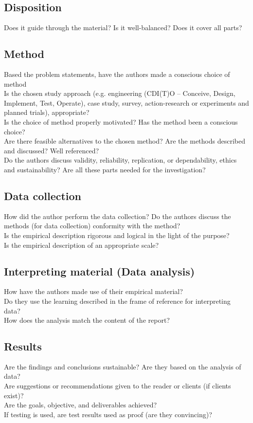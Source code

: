 \documentclass[11pt,a4paper]{article}
\begin{document}
\subsection*{Disposition}
Does it guide through the material? Is it well-balanced? Does it cover all parts?

\subsection*{Method}
Based the problem statements, have the authors made a conscious choice of method\\
Is the chosen study approach (e.g. engineering (CDI(T)O – Conceive, Design, Implement, Test, Operate), case study, survey, action-research or experiments and planned trials), appropriate?\\ 
Is the choice of method properly motivated? Has the method been a conscious choice?\\
Are there feasible alternatives to the chosen method? Are the methods described and discussed? Well referenced?\\
Do the authors discuss validity, reliability, replication, or dependability, ethics and sustainability? Are all these parts needed for the investigation?

\subsection*{Data collection}
How did the author perform the data collection? Do the authors discuss the methods (for data 
collection) conformity with the method?\\
Is the empirical description rigorous and logical in the light of the purpose?\\
Is the empirical description of an appropriate scale?

\subsection*{Interpreting material (Data analysis)}
How have the authors made use of their empirical material?\\
Do they use the learning described in the frame of reference for interpreting data?\\
How does the analysis match the content of the report?

\subsection*{Results}
Are the findings and conclusions sustainable?  Are they based on the analysis of data?\\
Are suggestions or recommendations given to the reader or clients (if clients exist)?\\
Are the goals, objective, and deliverables achieved?\\
If testing is used, are test results used as proof (are they convincing)? 
\end{document}
